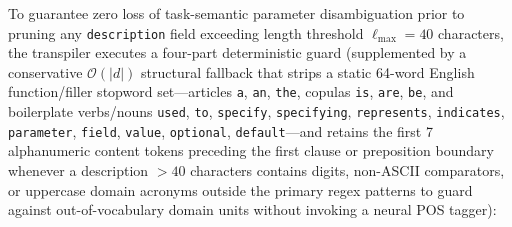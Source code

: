 \documentclass[conference,10pt]{IEEEtran}
\begin{document}
To guarantee zero loss of task-semantic parameter disambiguation prior to pruning any \texttt{description} field exceeding length threshold $\ell_{\max} = 40$ characters, the transpiler executes a four-part deterministic guard (supplemented by a conservative $\mathcal{O}(|d|)$ structural fallback that strips a static 64-word English function/filler stopword set---articles \texttt{a}, \texttt{an}, \texttt{the}, copulas \texttt{is}, \texttt{are}, \texttt{be}, and boilerplate verbs/nouns \texttt{used}, \texttt{to}, \texttt{specify}, \texttt{specifying}, \texttt{represents}, \texttt{indicates}, \texttt{parameter}, \texttt{field}, \texttt{value}, \texttt{optional}, \texttt{default}---and retains the first 7 alphanumeric content tokens preceding the first clause or preposition boundary whenever a description $> 40$ characters contains digits, non-ASCII comparators, or uppercase domain acronyms outside the primary regex patterns to guard against out-of-vocabulary domain units without invoking a neural POS tagger):
\end{document}

